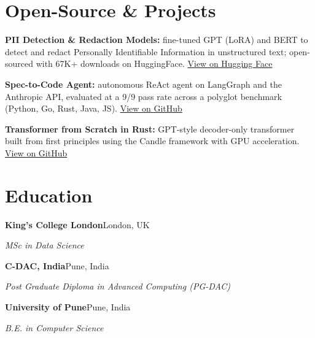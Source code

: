\documentclass[10pt,a4paper]{article}
\begin{document}
\section{Open-Source \& Projects}
\begin{tight}
  \item \textbf{PII Detection \& Redaction Models:} fine-tuned GPT (LoRA) and BERT to detect and redact Personally Identifiable Information in unstructured text; open-sourced with 67K+ downloads on HuggingFace. \href{https://huggingface.co/ab-ai/pii_model}{View on Hugging Face}
  \item \textbf{Spec-to-Code Agent:} autonomous ReAct agent on LangGraph and the Anthropic API, evaluated at a 9/9 pass rate across a polyglot benchmark (Python, Go, Rust, Java, JS). \href{https://github.com/abhijeetscode/Spec-to-Code-Agent}{View on GitHub}
  \item \textbf{Transformer from Scratch in Rust:} GPT-style decoder-only transformer built from first principles using the Candle framework with GPU acceleration. \href{https://github.com/abhijeetscode/transformer-rust}{View on GitHub}
\end{tight}

\section{Education}
{\color{company}\bfseries King's College London}\hfill {\color{muted}London, UK}\par
{\itshape MSc in Data Science}\par\vspace{2pt}
{\color{company}\bfseries C-DAC, India}\hfill {\color{muted}Pune, India}\par
{\itshape Post Graduate Diploma in Advanced Computing (PG-DAC)}\par\vspace{2pt}
{\color{company}\bfseries University of Pune}\hfill {\color{muted}Pune, India}\par
{\itshape B.E. in Computer Science}\par
\end{document}
